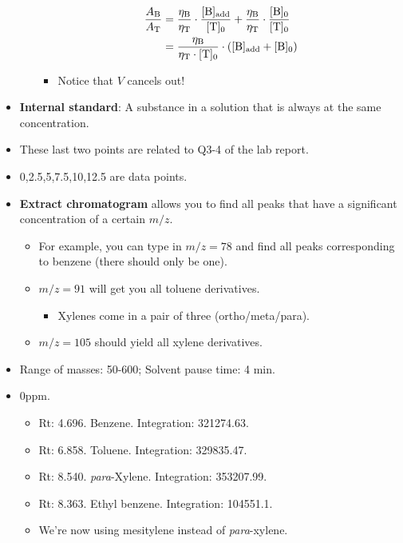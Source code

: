 \documentclass[../notes.tex]{subfiles}
\begin{document}
\begin{itemize}
\begin{itemize}
        \begin{align*}
            \frac{A_{\ce{B}}}{A_{\ce{T}}} &= \frac{\eta_{\ce{B}}}{\eta_{\ce{T}}}\cdot\frac{[\ce{B}]_\text{add}}{[\ce{T}]_0}+\frac{\eta_{\ce{B}}}{\eta_{\ce{T}}}\cdot\frac{[\ce{B}]_0}{[\ce{T}]_0}\\
            &= \frac{\eta_{\ce{B}}}{\eta_{\ce{T}}\cdot[\ce{T}]_0}\cdot([\ce{B}]_\text{add}+[\ce{B}]_0)
        \end{align*}
        \begin{itemize}
            \item Notice that $V$ cancels out!
        \end{itemize}
    \end{itemize}
    \item \textbf{Internal standard}: A substance in a solution that is always at the same concentration.
    \item These last two points are related to Q3-4 of the lab report.
    \item 0,2.5,5,7.5,10,12.5 are data points.
    \item \textbf{Extract chromatogram} allows you to find all peaks that have a significant concentration of a certain $m/z$.
    \begin{itemize}
        \item For example, you can type in $m/z=78$ and find all peaks corresponding to benzene (there should only be one).
        \item $m/z=91$ will get you all toluene derivatives.
        \begin{itemize}
            \item Xylenes come in a pair of three (ortho/meta/para).
        \end{itemize}
        \item $m/z=105$ should yield all xylene derivatives.
    \end{itemize}
    \item Range of masses: 50-600; Solvent pause time: 4 min.
    \item 0ppm.
    \begin{itemize}
        \item Rt: 4.696. Benzene. Integration: 321274.63.
        \item Rt: 6.858. Toluene. Integration: 329835.47.
        \item Rt: 8.540. \emph{para}-Xylene. Integration: 353207.99.
        \item Rt: 8.363. Ethyl benzene. Integration: 104551.1.
        \item We're now using mesitylene instead of \emph{para}-xylene.

\end{itemize}
\end{itemize}
\end{document}
